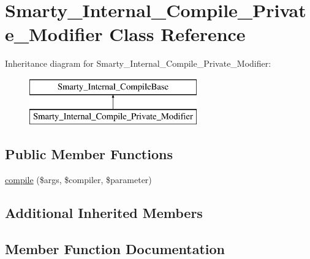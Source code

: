 \hypertarget{class_smarty___internal___compile___private___modifier}{}\section{Smarty\+\_\+\+Internal\+\_\+\+Compile\+\_\+\+Private\+\_\+\+Modifier Class Reference}
\label{class_smarty___internal___compile___private___modifier}
Inheritance diagram for Smarty\+\_\+\+Internal\+\_\+\+Compile\+\_\+\+Private\+\_\+\+Modifier\+:\begin{figure}[H]
\begin{center}
\leavevmode
\includegraphics[height=2.000000cm]{class_smarty___internal___compile___private___modifier}
\end{center}
\end{figure}
\subsection*{Public Member Functions}
\begin{DoxyCompactItemize}
\item 
\hyperlink{class_smarty___internal___compile___private___modifier_a84998958b9fc8c11c2ebe9620a49b853}{compile} (\$args, \$compiler, \$parameter)
\end{DoxyCompactItemize}
\subsection*{Additional Inherited Members}


\subsection{Member Function Documentation}
\hypertarget{class_smarty___internal___compile___private___modifier_a84998958b9fc8c11c2ebe9620a49b853}{}
